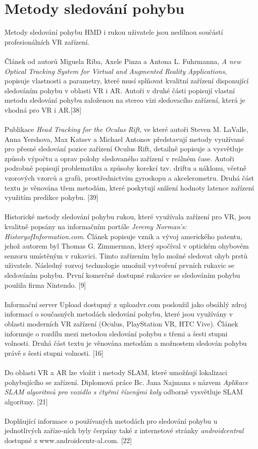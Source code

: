 \documentclass[a4paper, 12pt]{report}
\begin{document}
\section{Metody sledování pohybu}
Metody sledování pohybu HMD i rukou uživatele jsou nedílnou součástí profesionálních VR zařízení. \\
\\
Článek od autorů Miguela Riba, Axele Pinza a Antona L. Fuhrmanna, \textit{A new Optical Tracking System for Virtual and Augmented Reality Applications}, popisuje vlastnosti a parametry, které musí splňovat kvalitní zařízení disponující sledováním pohybu v oblasti VR i AR. Autoři v druhé části popisují vlastní metodu sledování pohybu založenou na stereo vizi sledovacího zařízení, která je vhodná pro VR i AR.[38]\\
\\
Publikace \textit{Head Tracking for the Oculus Rift}, ve které autoři Steven M. LaValle, Anna Yershova, Max Katsev a Michael Antonov představují metody využívané pro přesné sledování pozice zařízení Oculus Rift, detailně popisuje a vysvětluje způsob výpočtu a oprav polohy sledovaného zařízení v reálném čase. Autoři podrobně popisují problematiku a způsoby korekcí tzv. driftu a náklonu, včetně vzorových vzorců a grafů, prostřednictvím gyroskopu a akcelerometru. Druhá část textu je věnována třem metodám, které poskytují snížení hodnoty latence zařízení využitím predikce pohybu. [39]\\
\\
Historické metody sledování pohybu rukou, které využívala zařízení pro VR, jsou kvalitně popsány na informačním portále \textit{Jeremy Norman's: HistoryofInformation.com}. Článek popisuje vznik a vývoj amerického patentu, jehož autorem byl Thomas G. Zimmerman, který spočíval v optickém ohybovém senzoru umístěným v rukavici. Tímto zařízením bylo možné sledovat ohyb prstů uživatele. Následný rozvoj technologie umožnil vytvoření prvních rukavic se sledováním pohybu. První komerčně dostupné rukavice se sledováním pohybu použila firma Nintendo. [9]\\
\\
Informační server Upload dostupný z uploadvr.com posloužil jako obsáhlý zdroj informací o současných metodách sledování pohybu, které jsou využívány v oblasti moderních VR zařízení (Oculus, PlayStation VR, HTC Vive). Článek informuje o rozdílu mezi metodou sledování pohybu s třemi a šesti stupni volnosti. Druhá část textu je věnována metodám a možnostem sledován pohybu právě s šesti stupni volnosti. [16]\\
\\
Do oblasti VR a AR lze vložit i metody SLAM, které umožňují lokalizaci pohybujícího se zařízení. Diplomová práce Bc. Jana Najmana s názvem \textit{Aplikace SLAM algoritmů pro vozidlo s čtyřmi řízenými koly} odborně vysvětluje SLAM algoritmy. [21]\\
\\
Doplňující informace o používaných metodách pro sledování pohybu u jednotlivých zaříze-ních byly čerpány také z internetové stránky \textit{androidcentral} dostupné z www.androidcentr-al.com. [22]
\end{document}

